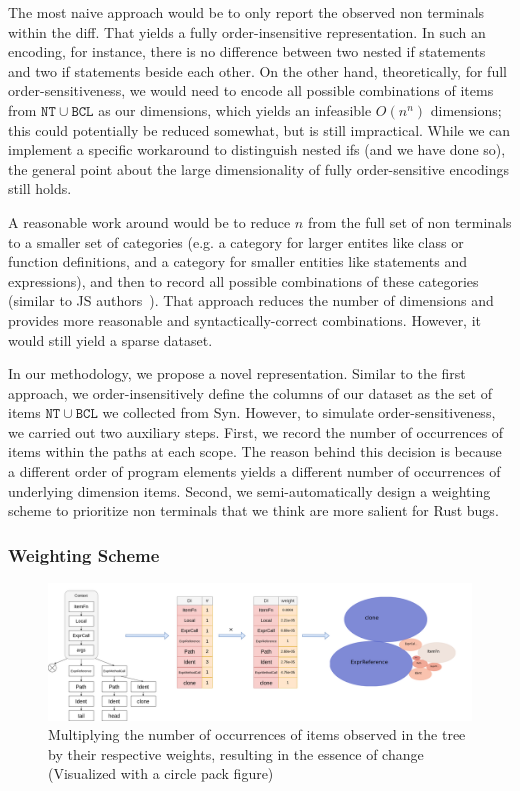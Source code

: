 The most naive approach would be to only report the observed non terminals within the diff. That yields a fully order-insensitive representation. In such an encoding, for instance, there is no difference between two nested if statements and two if statements beside each other. On the other hand, theoretically, for full order-sensitiveness, we would need to encode all possible combinations of items from $\mathtt{NT} \cup \mathtt{BCL}$ as our dimensions, which yields an infeasible $O(n^n)$ dimensions; this could potentially be reduced somewhat, but is still impractical. While we can implement a specific workaround to distinguish nested ifs (and we have done so), the general point about the large dimensionality of fully order-sensitive encodings still holds.

A reasonable work around would be to reduce $n$ from the full set of non terminals to a smaller set of categories (e.g. a category for larger entites like class or function definitions, and a category for smaller entities like statements and expressions), and then to record all possible combinations of these categories (similar to JS authors~\cite{foo}). That approach reduces the number of dimensions and provides more reasonable and syntactically-correct combinations. However, it would still yield a sparse dataset. 

In our methodology, we propose a novel representation. Similar to the first approach, we order-insensitively define the columns of our dataset as the set of items $\mathtt{NT} \cup \mathtt{BCL}$ we collected from Syn. However, to simulate order-sensitiveness, we carried out two auxiliary steps. First, we record the number of occurrences of items within the paths at each scope. The reason behind this decision is because a different order of program elements yields a different number of occurrences of underlying dimension items. Second, we semi-automatically design a weighting scheme to prioritize non terminals that we think are more salient for Rust bugs.

\subsubsection{\label{sec:weighting_scheme}Weighting Scheme}

\begin{figure}[h]
    \centering
    \includegraphics[width=1\textwidth]{figs/essence.png}
    \caption{\label{fig:essence}Multiplying the number of occurrences of items observed in the tree by their respective weights, resulting in the essence of change (Visualized with a circle pack figure)}
\end{figure}

